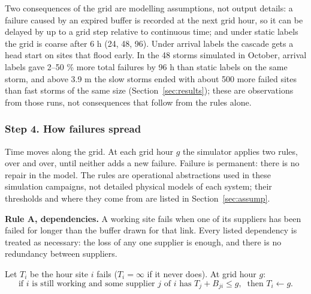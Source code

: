 \documentclass[11pt]{article}
\begin{document}
Two consequences of the grid are modelling assumptions, not output details: a failure caused by an expired buffer is recorded at the next grid hour, so it can be delayed by up to a grid step relative to continuous time; and under static labels the grid is coarse after 6 h (24, 48, 96). Under arrival labels the cascade gets a head start on sites that flood early. In the 48 storms simulated in October, arrival labels gave 2--50 \% more total failures by 96 h than static labels on the same storm, and above 3.9 m the slow storms ended with about 500 more failed sites than fast storms of the same size (Section~\ref{sec:results}); these are observations from those runs, not consequences that follow from the rules alone.

\subsubsection*{Step 4. How failures spread}

Time moves along the grid. At each grid hour $g$ the simulator applies two rules, over and over, until neither adds a new failure. Failure is permanent: there is no repair in the model. The rules are operational abstractions used in these simulation campaigns, not detailed physical models of each system; their thresholds and where they come from are listed in Section~\ref{sec:assump}.

\textbf{Rule A, dependencies.} A working site fails when one of its suppliers has been failed for longer than the buffer drawn for that link. Every listed dependency is treated as necessary: the loss of any one supplier is enough, and there is no redundancy between suppliers.

\begin{maths}
Let $T_i$ be the hour site $i$ fails ($T_i=\infty$ if it never does). At grid hour $g$:
\[
\text{if } i \text{ is still working and some supplier } j \text{ of } i \text{ has } T_j+B_{ji}\le g,\ \text{ then } T_i\leftarrow g .
\]
\end{maths}
\end{document}
